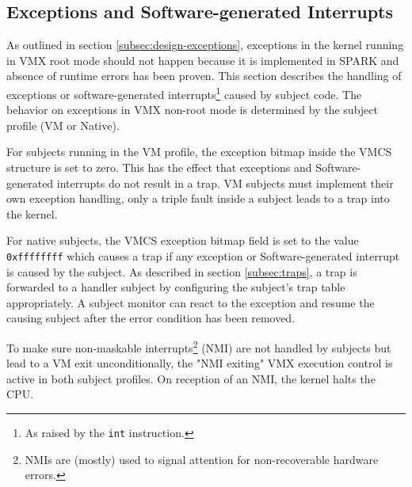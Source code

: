 \subsection{Exceptions and Software-generated Interrupts}
As outlined in section \ref{subsec:design-exceptions}, exceptions in the kernel
running in VMX root mode should not happen because it is implemented in SPARK
and absence of runtime errors has been proven.  This section describes the
handling of exceptions or software-generated interrupts\footnote{As raised by
the \texttt{int} instruction.} caused by subject code. The behavior on
exceptions in VMX non-root mode is determined by the subject profile (VM or
Native).

For subjects running in the VM profile, the exception bitmap inside the VMCS
structure is set to zero. This has the effect that exceptions and
Software-generated interrupts do not result in a trap. VM subjects must
implement their own exception handling, only a triple fault inside a subject
leads to a trap into the kernel.

For native subjects, the VMCS exception bitmap field is set to the value
\texttt{0xffffffff} which causes a trap if any exception or Software-generated
interrupt is caused by the subject. As described in section \ref{subsec:traps},
a trap is forwarded to a handler subject by configuring the subject's trap
table appropriately. A subject monitor can react to the exception and resume
the causing subject after the error condition has been removed.

To make sure non-maskable interrupts\footnote{NMIs are (mostly) used to signal
attention for non-recoverable hardware errors.} (NMI) are not
handled by subjects but lead to a VM exit unconditionally, the "NMI exiting"
VMX execution control is active in both subject profiles. On reception of an
NMI, the kernel halts the CPU.

